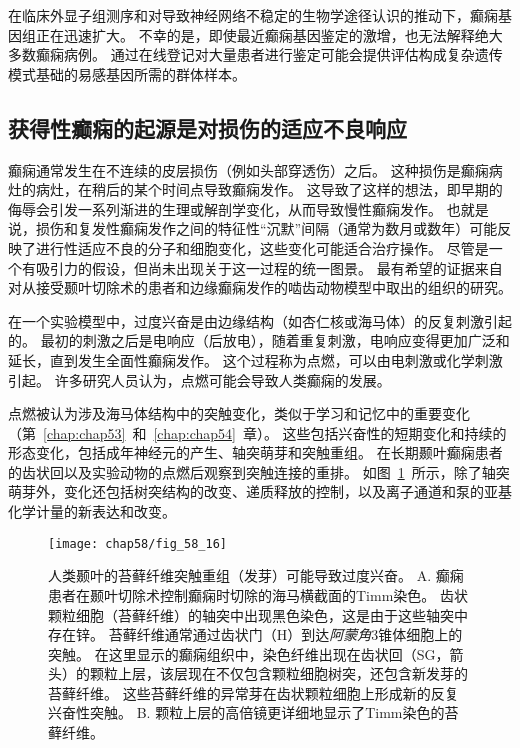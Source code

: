 在临床外显子组测序和对导致神经网络不稳定的生物学途径认识的推动下，癫痫基因组正在迅速扩大。
不幸的是，即使最近癫痫基因鉴定的激增，也无法解释绝大多数癫痫病例。
通过在线登记对大量患者进行鉴定可能会提供评估构成复杂遗传模式基础的易感基因所需的群体样本。



\subsection{获得性癫痫的起源是对损伤的适应不良响应}

癫痫通常发生在不连续的皮层损伤（例如头部穿透伤）之后。
这种损伤是癫痫病灶的病灶，在稍后的某个时间点导致癫痫发作。
这导致了这样的想法，即早期的侮辱会引发一系列渐进的生理或解剖学变化，从而导致慢性癫痫发作。
也就是说，损伤和复发性癫痫发作之间的特征性“沉默”间隔（通常为数月或数年）可能反映了进行性适应不良的分子和细胞变化，这些变化可能适合治疗操作。
尽管是一个有吸引力的假设，但尚未出现关于这一过程的统一图景。
最有希望的证据来自对从接受颞叶切除术的患者和边缘癫痫发作的啮齿动物模型中取出的组织的研究。


在一个实验模型中，过度兴奋是由边缘结构（如杏仁核或海马体）的反复刺激引起的。
最初的刺激之后是电响应（后放电），随着重复刺激，电响应变得更加广泛和延长，直到发生全面性癫痫发作。
这个过程称为点燃，可以由电刺激或化学刺激引起。
许多研究人员认为，点燃可能会导致人类癫痫的发展。


点燃被认为涉及海马体结构中的突触变化，类似于学习和记忆中的重要变化（第~\ref{chap:chap53}~和~\ref{chap:chap54}~章）。
这些包括兴奋性的短期变化和持续的形态变化，包括成年神经元的产生、轴突萌芽和突触重组。
在长期颞叶癫痫患者的齿状回以及实验动物的点燃后观察到突触连接的重排。
如图~\ref{fig:58_16}~所示，除了轴突萌芽外，变化还包括树突结构的改变、递质释放的控制，以及离子通道和泵的亚基化学计量的新表达和改变。


\begin{figure}[htbp]
	\centering
	\texttt{[image: chap58/fig\_58\_16]}
	\caption{人类颞叶的苔藓纤维突触重组（发芽）可能导致过度兴奋\cite{sutula1989mossy}。
		A. 癫痫患者在颞叶切除术控制癫痫时切除的海马横截面的Timm染色。
		齿状颗粒细胞（苔藓纤维）的轴突中出现黑色染色，这是由于这些轴突中存在锌。
		苔藓纤维通常通过齿状门（H）到达\textit{阿蒙角}3锥体细胞上的突触。
		在这里显示的癫痫组织中，染色纤维出现在齿状回（SG，箭头）的颗粒上层，该层现在不仅包含颗粒细胞树突，还包含新发芽的苔藓纤维。
		这些苔藓纤维的异常芽在齿状颗粒细胞上形成新的反复兴奋性突触。
		B. 颗粒上层的高倍镜更详细地显示了Timm染色的苔藓纤维。}
	\label{fig:58_16}
\end{figure}


